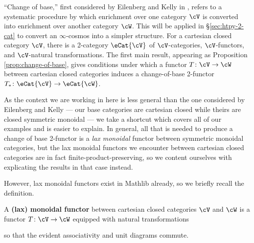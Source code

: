 ``Change of base,'' first considered by Eilenberg and Kelly in \cite{EilenbergKelly:1966cc}, refers to a systematic procedure by which enrichment over one category $\cV$ is converted into enrichment over another category $\cW$.  This will be applied in \S\ref{sec:htpy-2-cat} to convert an $\infty$-cosmos into a simpler structure.
For a cartesian closed category $\cV$, there is a 2-category $\eCat{\cV}$ of $\cV$-categories, $\cV$-functors, and $\cV$-natural transformations. The first main result, appearing as Proposition \ref{prop:change-of-base}, gives conditions under which a functor $T \colon \cV \to \cW$ between cartesian closed categories induces a change-of-base 2-functor $T_* \colon \eCat{\cV} \to \eCat{\cW}$.

As the context we are working in here is less general than the one considered by Eilenberg and Kelly --- our base categories are cartesian closed while theirs are closed symmetric monoidal --- we take a shortcut which covers all of our examples and is easier to explain.  In general, all that is needed to produce a change of base 2-functor is a \emph{lax monoidal} functor between symmetric monoidal categories, but the lax monoidal functors we encounter between cartesian closed categories are in fact finite-product-preserving, so we content ourselves with explicating the results in that case instead.

However, lax monoidal functors exist in Mathlib already, so we briefly recall the definition.

\begin{definition}\label{defn:lax-monoidal-functor}
  \leanok
 A \textbf{(lax) monoidal functor} between cartesian closed categories $\cV$ and $\cW$ is a functor $T \colon \cV \to \cW$ equipped with natural transformations
\begin{center}
\end{center}
so that the evident associativity and unit diagrams commute.
\end{definition}


